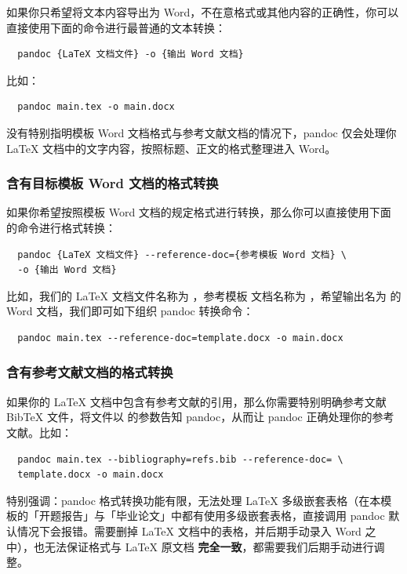 如果你只希望将文本内容导出为 Word，不在意格式或其他内容的正确性，你可以直接使用下面的命令进行最普通的文本转换：

\begin{verbatim}
  pandoc {LaTeX 文档文件} -o {输出 Word 文档} 
\end{verbatim}

比如：

\begin{verbatim}
  pandoc main.tex -o main.docx
\end{verbatim}

没有特别指明模板 Word 文档格式与参考文献文档的情况下，pandoc 仅会处理你 LaTeX 文档中的文字内容，按照标题、正文的格式整理进入 Word。

\subsubsection{含有目标模板 Word 文档的格式转换}

如果你希望按照模板 Word 文档的规定格式进行转换，那么你可以直接使用下面的命令进行格式转换：

\begin{verbatim}
  pandoc {LaTeX 文档文件} --reference-doc={参考模板 Word 文档} \
  -o {输出 Word 文档}
\end{verbatim}

比如，我们的 LaTeX 文档文件名称为 ，参考模板  文档名称为 ，希望输出名为  的 Word 文档，我们即可如下组织 pandoc 转换命令：

\begin{verbatim}
  pandoc main.tex --reference-doc=template.docx -o main.docx
\end{verbatim}

\subsubsection{含有参考文献文档的格式转换}

如果你的 LaTeX 文档中包含有参考文献的引用，那么你需要特别明确参考文献 BibTeX 文件，将文件以  的参数告知 pandoc，从而让 pandoc 正确处理你的参考文献。比如：

\begin{verbatim}
  pandoc main.tex --bibliography=refs.bib --reference-doc= \
  template.docx -o main.docx
\end{verbatim}

特别强调：pandoc 格式转换功能有限，无法处理 LaTeX 多级嵌套表格（在本模板的「开题报告」与「毕业论文」中都有使用多级嵌套表格，直接调用 pandoc 默认情况下会报错。需要删掉 LaTeX 文档中的表格，并后期手动录入 Word 之中），也无法保证格式与 LaTeX 原文档 \textbf{完全一致}，都需要我们后期手动进行调整。